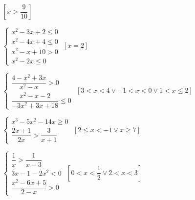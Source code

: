 \begin{esercizio}[\Ast]
\begin{enumeratea}
 \hfill \(\left[x>\dfrac{9}{10}\right]\)
\item \(\left\{\begin{array}{l}
           x^2-3x+2\le 0\\
           x^2-4x+4\le 0\\
           x^2-x+10>0\\
           x^2-2x\le 0 \end{array}\right.\)
 \hfill \(\left[x=2\right]\)
\item \(\left\{\begin{array}{l}
           \dfrac{4-x^2+3x}{x^2-x}>0 \\
           \dfrac{x^2-x-2}{-3x^2+3x+18} \le 0 \end{array}\right.\)
 \hfill \(\left[3<x<4\vee -1<x<0\vee 1<x\le 2\right]\)
\item \(\left\{\begin{array}{l}
           x^3-5x^2-14x\ge 0 \\ 
           \dfrac{2x+1}{2x} > \dfrac 3{x+1}\end{array}\right.\)
 \hfill \(\left[2\le x<-1\vee x\ge 7\right]\)
\item \(\left\{\begin{array}{l}
           \dfrac 1 x>\dfrac 1{x-3}\\
           3x-1-2x^2<0\\
           \dfrac{x^2-6x+5}{2-x}>0 \end{array}\right.\)
 \hfill \(\left[0<x<\dfrac 1 2\vee 2<x<3\right]\)
 \end{enumeratea}
\end{esercizio}

